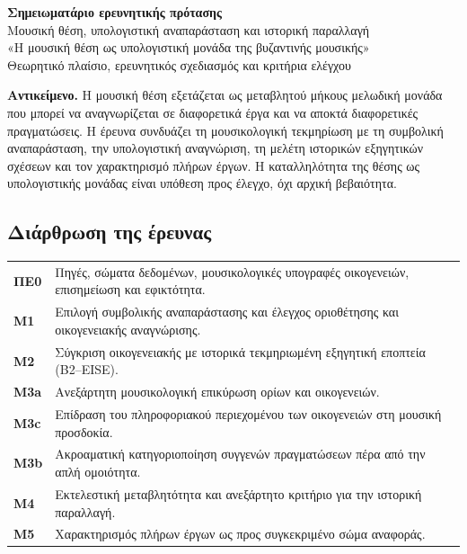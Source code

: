 \documentclass[11pt,a4paper]{extarticle}
\begin{document}
\setcounter{tocdepth}{1}
\begin{center}
{\sffamily\bfseries\LARGE Σημειωματάριο ερευνητικής πρότασης}\\[3mm]
{\sffamily\Large Μουσική θέση, υπολογιστική αναπαράσταση και ιστορική παραλλαγή}\\[3mm]
{\large «Η μουσική θέση ως υπολογιστική μονάδα της βυζαντινής μουσικής»}\\[4mm]
{\small Θεωρητικό πλαίσιο, ερευνητικός σχεδιασμός και κριτήρια ελέγχου}
\end{center}

\begin{keybox}
\textbf{Αντικείμενο.} Η μουσική θέση εξετάζεται ως μεταβλητού μήκους μελωδική μονάδα που μπορεί να αναγνωρίζεται σε διαφορετικά έργα και να αποκτά διαφορετικές πραγματώσεις. Η έρευνα συνδυάζει τη μουσικολογική τεκμηρίωση με τη συμβολική αναπαράσταση, την υπολογιστική αναγνώριση, τη μελέτη ιστορικών εξηγητικών σχέσεων και τον χαρακτηρισμό πλήρων έργων. Η καταλληλότητα της θέσης ως υπολογιστικής μονάδας είναι υπόθεση προς έλεγχο, όχι αρχική βεβαιότητα.
\end{keybox}

\subsection*{Διάρθρωση της έρευνας}
\begin{tabularx}{.97\linewidth}{>{\bfseries\sffamily}p{1.45cm}X}
ΠΕ0 & Πηγές, σώματα δεδομένων, μουσικολογικές υπογραφές οικογενειών, επισημείωση και εφικτότητα.\\
M1 & Επιλογή συμβολικής αναπαράστασης και έλεγχος οριοθέτησης και οικογενειακής αναγνώρισης.\\
M2 & Σύγκριση οικογενειακής με ιστορικά τεκμηριωμένη εξηγητική εποπτεία (B2--EISE).\\
M3a & Ανεξάρτητη μουσικολογική επικύρωση ορίων και οικογενειών.\\
M3c & Επίδραση του πληροφοριακού περιεχομένου των οικογενειών στη μουσική προσδοκία.\\
M3b & Ακροαματική κατηγοριοποίηση συγγενών πραγματώσεων πέρα από την απλή ομοιότητα.\\
M4 & Εκτελεστική μεταβλητότητα και ανεξάρτητο κριτήριο για την ιστορική παραλλαγή.\\
M5 & Χαρακτηρισμός πλήρων έργων ως προς συγκεκριμένο σώμα αναφοράς.\\
\end{tabularx}
\end{document}

